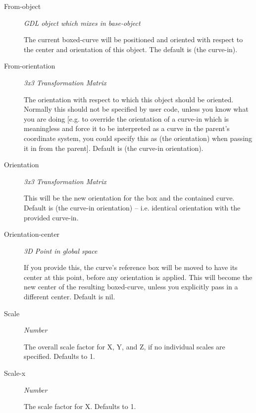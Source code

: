 \documentclass [11pt]{book}
\begin{document}
\begin{itemize}
\begin{description}
\item [From-object]
\emph{GDL object which mixes in base-object}

 The current boxed-curve will be positioned and oriented with respect
to the center and orientation of this object. The default is (the curve-in).




\item [From-orientation]
\emph{3x3 Transformation Matrix}

 The orientation with respect to which this object should be oriented. Normally
this should not be specified by user code, unless you know what you are doing [e.g. to override the orientation
of a curve-in which is meaningless and force it to be interpreted as a curve in the parent's coordinate system,
you could specify this as (the orientation) when passing it in from the parent].
Default is (the curve-in orientation).




\item [Orientation]
\emph{3x3 Transformation Matrix}

 This will be the new orientation for the box and the contained curve. Default is
(the curve-in orientation) -- i.e. identical orientation with the provided curve-in.




\item [Orientation-center]
\emph{3D Point in global space}

 If you provide this, the curve's reference box will be moved to have its center
at this point, before any orientation is applied. This will become the new center of the resulting boxed-curve,
unless you explicitly pass in a different center. Default is nil.




\item [Scale]
\emph{Number}

 The overall scale factor for X, Y, and Z, if no individual scales are specified. Defaults to 1.




\item [Scale-x]
\emph{Number}

 The scale factor for X. Defaults to 1.





\end{description}
\end{itemize}
\end{document}
